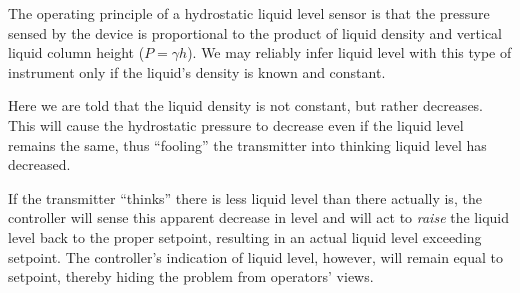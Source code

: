 
The operating principle of a hydrostatic liquid level sensor is that the pressure sensed by the device is proportional to the product of liquid density and vertical liquid column height ($P = \gamma h$).  We may reliably infer liquid level with this type of instrument only if the liquid's density is known and constant.  

\vskip 10pt

Here we are told that the liquid density is not constant, but rather decreases.  This will cause the hydrostatic pressure to decrease even if the liquid level remains the same, thus ``fooling'' the transmitter into thinking liquid level has decreased.

\vskip 10pt

If the transmitter ``thinks'' there is less liquid level than there actually is, the controller will sense this apparent decrease in level and will act to {\it raise} the liquid level back to the proper setpoint, resulting in an actual liquid level exceeding setpoint.  The controller's indication of liquid level, however, will remain equal to setpoint, thereby hiding the problem from operators' views.




